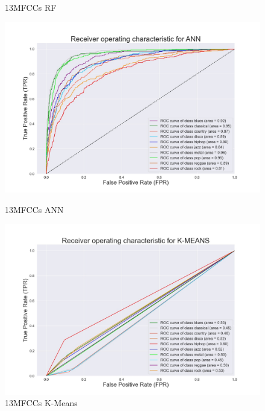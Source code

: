 \documentclass[conference]{IEEEtran}
\begin{document}
\begin{figure}[!ht]
\begin{center}
\begin{minipage}[t]{.24\textwidth}
            \caption{13MFCCs RF}
            \label{fig:13MFCCs RF Frequency Features}
        \end{minipage}
        \begin{minipage}[t]{.24\textwidth}
            \centering
            \includegraphics[width=\textwidth]{plot/SL/frequency_features/13/ANN_13MFCC_10000_10GEN_GTZAN - ROC Plot.jpg}
            \caption{13MFCCs ANN}
            \label{fig:13MFCCs ANN Frequency Features}
        \end{minipage}
        \begin{minipage}[t]{.24\textwidth}
            \centering
            \includegraphics[width=\textwidth]{plot/UL/frequency_features/13/13MFCC_10000_10GEN_GTZAN - ROC Plot.jpg}
            \caption{13MFCCs K-Means}
            \label{fig:13MFCCs K-Means Frequency Features}
        \end{minipage}
    \end{center}
\end{figure}
\end{document}
